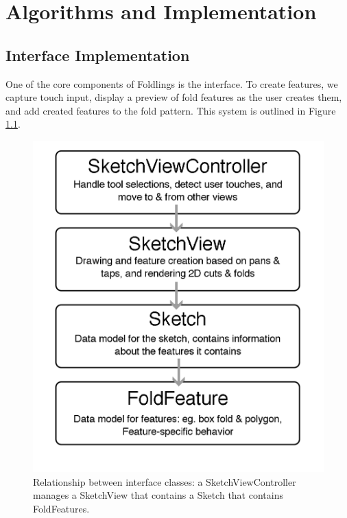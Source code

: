 \chapter{Algorithms and Implementation}

\section{Interface Implementation}\label{interface-implementation}

One of the core components of Foldlings is the interface. To create
features, we capture touch input, display a preview of fold features as
the user creates them, and add created features to the fold pattern.
This system is outlined in Figure \ref{mvc}.

\begin{figure}[htbp]
\centering
\includegraphics{figures/40_Tech_Interface_Implementation/sketchview-descendents-thesis-figure.png}
\caption{Relationship between interface classes: a SketchViewController
manages a SketchView that contains a Sketch that contains FoldFeatures.
\label{mvc}}
\end{figure}

